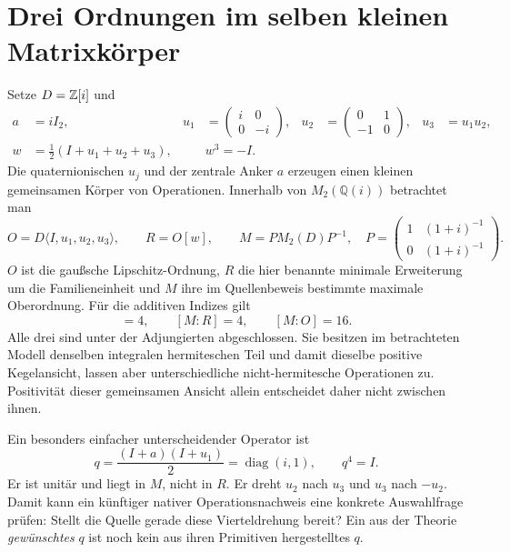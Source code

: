 \section{Drei Ordnungen im selben kleinen Matrixkörper}
Setze $D=\mathbb Z[i]$ und
\begin{align}
a&=iI_2,&u_1&=\begin{pmatrix}i&0\\0&-i\end{pmatrix},&
u_2&=\begin{pmatrix}0&1\\-1&0\end{pmatrix},&u_3&=u_1u_2,\\
w&=\tfrac12(I+u_1+u_2+u_3),&&w^3=-I.
\end{align}
Die quaternionischen $u_j$ und der zentrale Anker $a$ erzeugen einen kleinen gemeinsamen Körper von Operationen. Innerhalb von $M_2(\mathbb Q(i))$ betrachtet man
\begin{equation}
O=D\langle I,u_1,u_2,u_3\rangle,\qquad R=O[w],\qquad
M=P M_2(D)P^{-1},\quad
P=\begin{pmatrix}1&(1+i)^{-1}\\0&(1+i)^{-1}\end{pmatrix}.
\end{equation}
$O$ ist die gaußsche Lipschitz-Ordnung, $R$ die hier benannte minimale Erweiterung um die Familieneinheit und $M$ ihre im Quellenbeweis bestimmte maximale Oberordnung. Für die additiven Indizes gilt
\begin{equation}
[R:O]=4,\qquad[M:R]=4,\qquad[M:O]=16.
\end{equation}
Alle drei sind unter der Adjungierten abgeschlossen. Sie besitzen im betrachteten Modell denselben integralen hermiteschen Teil und damit dieselbe positive Kegelansicht, lassen aber unterschiedliche nicht-hermitesche Operationen zu. Positivität dieser gemeinsamen Ansicht allein entscheidet daher nicht zwischen ihnen.

Ein besonders einfacher unterscheidender Operator ist
\begin{equation}
q=\frac{(I+a)(I+u_1)}2=\operatorname{diag}(i,1),
\qquad q^4=I.
\end{equation}
Er ist unitär und liegt in $M$, nicht in $R$. Er dreht $u_2$ nach $u_3$ und $u_3$ nach $-u_2$. Damit kann ein künftiger nativer Operationsnachweis eine konkrete Auswahlfrage prüfen: Stellt die Quelle gerade diese Vierteldrehung bereit? Ein aus der Theorie \emph{gewünschtes} $q$ ist noch kein aus ihren Primitiven hergestelltes $q$.

